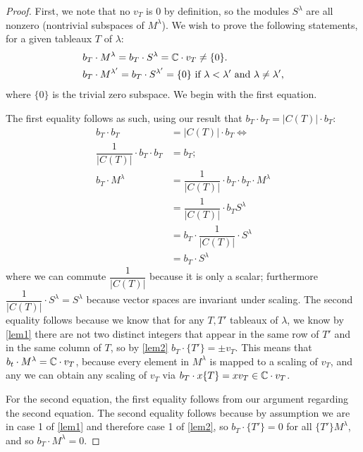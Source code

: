 \documentclass[12pt,twoside]{reedthesis}
\theoremstyle{plain}   %
\theoremstyle{definition}
\theoremstyle{remark}
\numberwithin{equation}{section}
\begin{document}
  \begin{proof}
    First, we note that no $v_T$ is $0$ by definition, so the modules $S^\lambda$ are all nonzero (nontrivial subspaces of $M^\lambda$).
    We wish to prove the following statements, for a given tableaux $T$ of $\lambda$:
    \begin{align}
      &b_T \cdot M^\lambda = b_T \cdot S^\lambda = \mathbb{C} \cdot v_T \neq \{0\}. \\
      &b_T \cdot M^{\lambda'} = b_T \cdot S^{\lambda'} = \{0\} \text{ if $\lambda < \lambda'$ and $\lambda \neq \lambda'$,}
    \end{align}
    where $\{0\}$ is the trivial zero subspace.
    We begin with the first equation. \par
    The first equality follows as such, using our result that $b_T \cdot b_T = |C(T)| \cdot b_T$:
    \begin{align*}
      b_T \cdot b_T &= |C(T)| \cdot b_T \iff \\
      \dfrac{1}{|C(T)|} \cdot b_T \cdot b_T &= b_T;\\
      b_T \cdot M^\lambda &= \dfrac{1}{|C(T)|} \cdot b_T \cdot b_T \cdot M^\lambda \\
                    &=\dfrac{1}{|C(T)|} \cdot b_T S^\lambda \\
                    &= b_T \cdot \dfrac{1}{|C(T)|}  \cdot S^\lambda \\
                    &= b_T \cdot S^\lambda
    \end{align*}
    where we can commute $\dfrac{1}{|C(T)|}$ because it is only a scalar; furthermore $\dfrac{1}{|C(T)|}  \cdot S^\lambda = S^\lambda$
    because vector spaces are invariant under scaling.
    The second equality follows because we know that for any $T,T'$ tableaux of $\lambda$, we know by \cref{lem1} there are not
    two distinct integers that appear in the same row of $T'$ and in the same column of $T$, so by \cref{lem2}
    $b_T \cdot \{T'\} = \pm v_T$.
    This means that $b_t \cdot M^\lambda = \mathbb{C} \cdot v_T$,
    because every element in $M^\lambda$ is mapped to a scaling of $v_T$, and any we can obtain any scaling of $v_T$ via
    $b_T \cdot x \{T\} =x v_T \in \mathbb{C} \cdot v_T$. \par
    For the second equation, the first equality follows from our argument regarding the second equation.
    The second equality follows because by assumption we are in case 1 of \cref{lem1} and therefore case 1 of \cref{lem2},
    so $b_T \cdot \{T'\} = 0$ for all $\{T'\} M^\lambda$, and so $b_T \cdot M^\lambda = 0$.\par

\end{proof}
\end{document}
